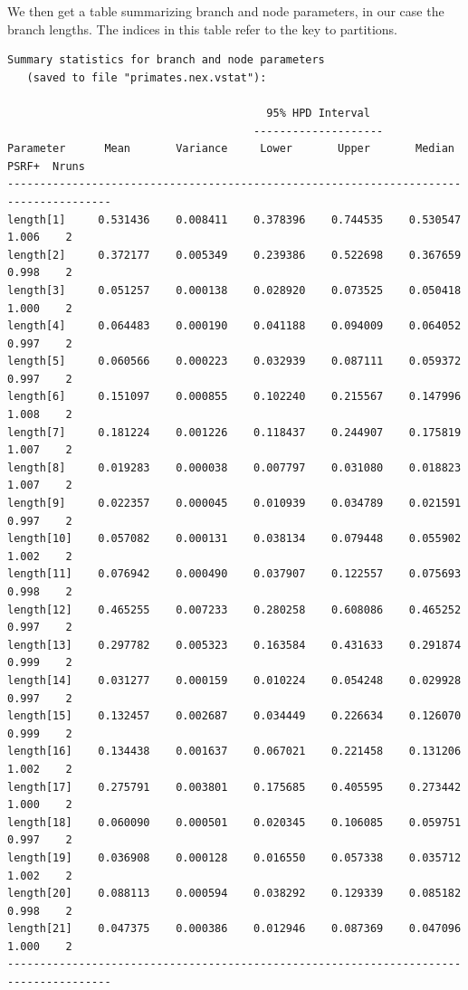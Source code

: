 \documentclass[12pt]{book}
\begin{document}
We then get a table summarizing branch and node parameters, in our case the branch lengths. The
indices in this table refer to the key to partitions.

\begin{Verbatim}[fontsize=\footnotesize]
Summary statistics for branch and node parameters
   (saved to file "primates.nex.vstat"):

                                        95% HPD Interval
                                      --------------------
Parameter      Mean       Variance     Lower       Upper       Median     PSRF+  Nruns
--------------------------------------------------------------------------------------
length[1]     0.531436    0.008411    0.378396    0.744535    0.530547    1.006    2
length[2]     0.372177    0.005349    0.239386    0.522698    0.367659    0.998    2
length[3]     0.051257    0.000138    0.028920    0.073525    0.050418    1.000    2
length[4]     0.064483    0.000190    0.041188    0.094009    0.064052    0.997    2
length[5]     0.060566    0.000223    0.032939    0.087111    0.059372    0.997    2
length[6]     0.151097    0.000855    0.102240    0.215567    0.147996    1.008    2
length[7]     0.181224    0.001226    0.118437    0.244907    0.175819    1.007    2
length[8]     0.019283    0.000038    0.007797    0.031080    0.018823    1.007    2
length[9]     0.022357    0.000045    0.010939    0.034789    0.021591    0.997    2
length[10]    0.057082    0.000131    0.038134    0.079448    0.055902    1.002    2
length[11]    0.076942    0.000490    0.037907    0.122557    0.075693    0.998    2
length[12]    0.465255    0.007233    0.280258    0.608086    0.465252    0.997    2
length[13]    0.297782    0.005323    0.163584    0.431633    0.291874    0.999    2
length[14]    0.031277    0.000159    0.010224    0.054248    0.029928    0.997    2
length[15]    0.132457    0.002687    0.034449    0.226634    0.126070    0.999    2
length[16]    0.134438    0.001637    0.067021    0.221458    0.131206    1.002    2
length[17]    0.275791    0.003801    0.175685    0.405595    0.273442    1.000    2
length[18]    0.060090    0.000501    0.020345    0.106085    0.059751    0.997    2
length[19]    0.036908    0.000128    0.016550    0.057338    0.035712    1.002    2
length[20]    0.088113    0.000594    0.038292    0.129339    0.085182    0.998    2
length[21]    0.047375    0.000386    0.012946    0.087369    0.047096    1.000    2
--------------------------------------------------------------------------------------
\end{Verbatim}
\end{document}
